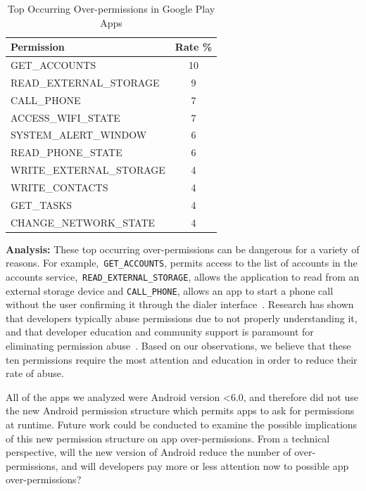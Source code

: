 \documentclass{llncs}
\begin{document}
\begin{table}[]
\begin{center}
\caption{Top Occurring Over-permissions in Google Play Apps}
\label{Table:topOverPrivs}
 \begin{tabular}{ | l | c | } \hline

  \bfseries Permission & \bfseries Rate  \% \\ \hline
	
	GET\_ACCOUNTS  & 10 \\ \hline
	READ\_EXTERNAL\_STORAGE & 9 \\ \hline
	CALL\_PHONE  & 7 \\ \hline
	ACCESS\_WIFI\_STATE & 7 \\ \hline
	SYSTEM\_ALERT\_WINDOW & 6 \\ \hline
	READ\_PHONE\_STATE  & 6 \\ \hline
	WRITE\_EXTERNAL\_STORAGE  & 4 \\ \hline
	WRITE\_CONTACTS  & 4 \\ \hline
	GET\_TASKS & 4 \\ \hline
	CHANGE\_NETWORK\_STATE  & 4 \\ \hline
	 	
  \end{tabular}
\end{center}
\end{table}



\noindent
\textbf{Analysis:} These top occurring over-permissions can be dangerous for a variety of reasons. For example,~\texttt{GET\_ACCOUNTS}, permits access to the list of accounts in the accounts service,~\texttt{READ\_EXTERNAL\_STORAGE}, allows the application to read from an external storage device and \texttt{CALL\_PHONE}, allows an app to start a phone call without the user confirming it through the dialer interface~\cite{manifest_url}. Research has shown that developers typically abuse permissions due to not properly understanding it, and that developer education and community support is paramount for eliminating permission abuse~\cite{6624000}. Based on our observations, we believe that these ten permissions require the most attention and education in order to reduce their rate of abuse.

All of the apps we analyzed were Android version \textless 6.0, and therefore did not use the new Android permission structure which permits apps to ask for permissions at runtime. Future work could be conducted to examine the possible implications of this new permission structure on app over-permissions. From a technical perspective, will the new version of Android reduce the number of over-permissions, and will developers pay more or less attention now to possible app over-permissions?
\end{document}

